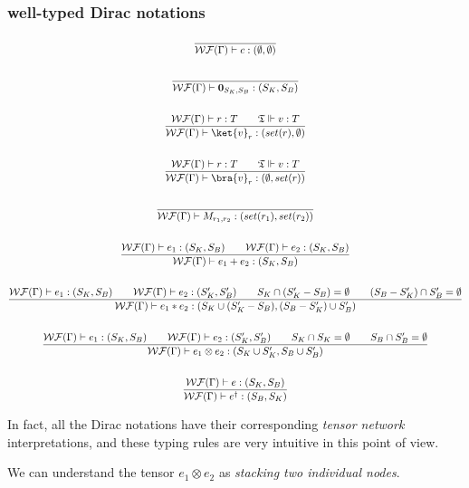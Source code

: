 \subsubsection*{well-typed Dirac notations}
\begin{gather*}
  \frac{}{\mathcal{WF}(\Gamma)\vdash c : (\emptyset, \emptyset)} \\
  \ \\
  \frac{}{\mathcal{WF}(\Gamma)\vdash \textbf{0}_{S_K, S_B} : (S_K, S_B)}\\
  \ \\
  \frac{\mathcal{WF}(\Gamma)\vdash r : T \qquad \mathfrak{T} \Vdash v : T}{\mathcal{WF}(\Gamma)\vdash \ket{v}_r : (set(r), \emptyset)}\\
  \ \\
  \frac{\mathcal{WF}(\Gamma)\vdash r : T \qquad \mathfrak{T} \Vdash v : T}{\mathcal{WF}(\Gamma)\vdash \bra{v}_r : (\emptyset, set(r))}\\
  \ \\
  \frac{}{\mathcal{WF}(\Gamma)\vdash M_{r_1, r_2} : (set(r_1), set(r_2))}\\
  \ \\
  \frac{\mathcal{WF}(\Gamma)\vdash e_1 : (S_K, S_B)\qquad \mathcal{WF}(\Gamma)\vdash e_2 : (S_K, S_B)}{\mathcal{WF}(\Gamma)\vdash e_1 + e_2 : (S_K, S_B)}\\
  \ \\
  \frac{\mathcal{WF}(\Gamma)\vdash e_1 : (S_K, S_B)\qquad \mathcal{WF}(\Gamma)\vdash e_2 : (S_K', S_B')\qquad S_K \cap (S_K'-S_B) = \emptyset\qquad (S_B-S_K')\cap S_B' = \emptyset}{\mathcal{WF}(\Gamma)\vdash e_1 * e_2 : (S_K \cup (S_K' - S_B), (S_B-S_K') \cup S_B')}\\
  \ \\
  \frac{\mathcal{WF}(\Gamma)\vdash e_1 : (S_K, S_B)\qquad \mathcal{WF}(\Gamma)\vdash e_2 : (S_K', S_B')\qquad S_K \cap S_K= \emptyset\qquad S_B\cap S_B' = \emptyset}{\mathcal{WF}(\Gamma)\vdash e_1 \otimes e_2 : (S_K \cup S_K', S_B \cup S_B')}\\
  \ \\
  \frac{\mathcal{WF}(\Gamma)\vdash e : (S_K, S_B)}{\mathcal{WF}(\Gamma)\vdash e^\dagger : (S_B, S_K)}
\end{gather*}

In fact, all the Dirac notations have their corresponding \textit{tensor network} interpretations, and these typing rules are very intuitive in this point of view.

We can understand the tensor $e_1 \otimes e_2$ as \textit{stacking two individual nodes}.

